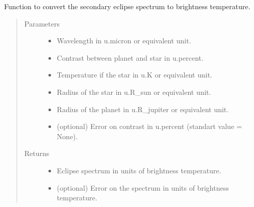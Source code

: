\documentclass[a4paper,10pt,english]{sphinxmanual}
\begin{document}

\begin{fulllineitems}
\label{\detokenize{cascade.exoplanet_tools:cascade.exoplanet_tools.exoplanet_tools.convert_spectrum_to_brighness_temperature}}
Function to convert the secondary eclipse spectrum to brightness
temperature.
\begin{quote}\begin{description}
\item[{Parameters}] \leavevmode\begin{itemize}
\item {} 
 \textendash{} Wavelength in u.micron or equivalent unit.

\item {} 
 \textendash{} Contrast between planet and star in u.percent.

\item {} 
 \textendash{} Temperature if the star in u.K or equivalent unit.

\item {} 
 \textendash{} Radius of the star in u.R\_sun or equivalent unit.

\item {} 
 \textendash{} Radius of the planet in u.R\_jupiter or equivalent unit.

\item {} 
 \textendash{} (optional) Error on contrast in u.percent (standart value = None).

\end{itemize}

\item[{Returns}] \leavevmode
\begin{itemize}
\item {} 
 \textendash{} Eclipse spectrum in units of brightness temperature.

\item {} 
 \textendash{} (optional) Error on the spectrum in units of brightness temperature.

\end{itemize}


\end{description}\end{quote}

\end{fulllineitems}
\end{document}
